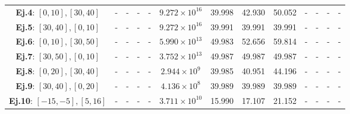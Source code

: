 \begin{table}
\begin{tabular}{|c|cccc|cccc|cccc|}
    \textbf{Ej.4}: $[0,10], [30,40]$           & -                                             & -                                                & -                                   & -        & $9.272\times10^{16}$ & 39.998         & 42.930                  & 50.052   & -                    & -              & -                       & -        \\
    \textbf{Ej.5}: $[30,40], [0,10]$           & -                                             & -                                                & -                                   & -        & $9.272\times10^{16}$ & 39.991         & 39.991                  & 39.991   & -                    & -              & -                       & -        \\
    \textbf{Ej.6}: $[0,10], [30,50]$           & -                                             & -                                                & -                                   & -        & $5.990\times10^{13}$ & 49.983         & 52.656                  & 59.814   & -                    & -              & -                       & -        \\
    \textbf{Ej.7}: $[30,50], [0,10]$           & -                                             & -                                                & -                                   & -        & $3.752\times10^{13}$ & 49.987         & 49.987                  & 49.987   & -                    & -              & -                       & -        \\
    \textbf{Ej.8}: $[0,20], [30,40]$           & -                                             & -                                                & -                                   & -        & $2.944\times10^{9}$  & 39.985         & 40.951                  & 44.196   & -                    & -              & -                       & -        \\
    \textbf{Ej.9}: $[30,40], [0,20]$           & -                                             & -                                                & -                                   & -        & $4.136\times10^{8}$  & 39.989         & 39.989                  & 39.989   & -                    & -              & -                       & -        \\
    \textbf{Ej.10}: $[-15,-5], [5,16]$         & -                                             & -                                                & -                                   & -        & $3.711\times10^{10}$ & 15.990         & 17.107                  & 21.152   & -                    & -              & -                       & -        \\

\end{tabular}
\end{table}
